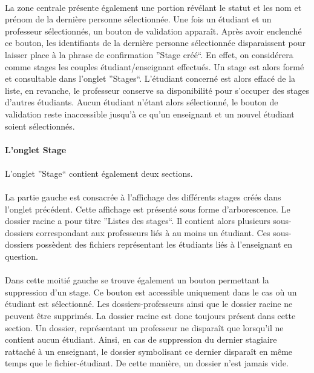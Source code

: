 \documentclass[a4paper,10pt]{report}
\begin{document}
	      \paragraph{}      
		La zone centrale présente également une portion révélant le statut et les nom et prénom de la dernière personne sélectionnée.
		Une fois un étudiant et un professeur sélectionnés, un bouton de validation apparaît.
		Après avoir enclenché ce bouton, les identifiants de la dernière personne sélectionnée disparaissent pour laisser place à la phrase de confirmation ''Stage créé``.
		En effet, on considérera comme stages les couples étudiant/enseignant effectués.
		Un stage est alors formé et consultable dans l'onglet ''Stages``. 
		L'étudiant concerné est alors effacé de la liste, en revanche, le professeur conserve sa disponibilité pour s'occuper des stages d'autres étudiants.
		Aucun étudiant n'étant alors sélectionné, le bouton de validation reste inaccessible jusqu'à ce qu'un enseignant et un nouvel étudiant soient sélectionnés.
		
	    \paragraph{L'onglet Stage}
		\paragraph{}
		  L'onglet ''Stage`` contient également deux sections.
		  
		\paragraph{}
		  La partie gauche est consacrée à l'affichage des différents stages créés dans l'onglet précédent.
		  Cette affichage est présenté sous forme d'arborescence.
		  Le dossier racine a pour titre ''Listes des stages``.
		  Il contient alors plusieurs sous-dossiers correspondant aux professeurs liés à au moins un étudiant.
		  Ces sous-dossiers possèdent des fichiers représentant les étudiants liés à l'enseignant en question.
		  
		\paragraph{}
		  Dans cette moitié gauche se trouve également un bouton permettant la suppression d'un stage.
		  Ce bouton est accessible uniquement dans le cas où un étudiant est sélectionné.
		  Les dossiers-professeurs ainsi que le dossier racine ne peuvent être supprimés.
		  La dossier racine est donc toujours présent dans cette section.
		  Un dossier, représentant un professeur ne disparaît que lorsqu'il ne contient aucun étudiant.
		  Ainsi, en cas de suppression du dernier stagiaire rattaché à un enseignant, le dossier symbolisant ce dernier disparaît en même temps que le fichier-étudiant.
		  De cette manière, un dossier n'est jamais vide.
		  
\end{document}
